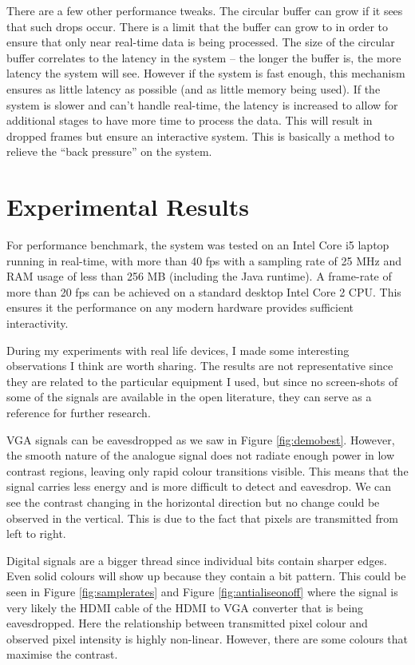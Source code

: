 \documentclass[a4paper,12pt,twoside,openright]{report}
\begin{document}
There are a few other performance tweaks. The circular buffer can grow if it sees that such drops occur. There is a limit that the buffer can grow to in order to ensure that only near real-time data is being processed. The size of the circular buffer correlates to the latency in the system -- the longer the buffer is, the more latency the system will see. However if the system is fast enough, this mechanism ensures as little latency as possible (and as little memory being used). If the system is slower and can't handle real-time, the latency is increased to allow for additional stages to have more time to process the data. This will result in dropped frames but ensure an interactive system. This is basically a method to relieve the ``back pressure'' on the system. 

\section{Experimental Results}

For performance benchmark, the system was tested on an Intel Core i5 laptop running in real-time, with more than 40 fps with a sampling rate of 25 MHz and RAM usage of less than 256 MB (including the Java runtime). A frame-rate of more than 20 fps can be achieved on a standard desktop Intel Core 2 CPU. This ensures it the performance on any modern hardware provides sufficient interactivity.

During my experiments with real life devices, I made some interesting observations I think are worth sharing. The results are not representative since they are related to the particular equipment I used, but since no screen-shots of some of the signals are available in the open literature, they can serve as a reference for further research.

VGA signals can be eavesdropped as we saw in Figure \ref{fig:demobest}. However, the smooth nature of the analogue signal does not radiate enough power in low contrast regions, leaving only rapid colour transitions visible. This means that the signal carries less energy and is more difficult to detect and eavesdrop. We can see the contrast changing in the horizontal direction but no change could be observed in the vertical. This is due to the fact that pixels are transmitted from left to right.

Digital signals are a bigger thread since individual bits contain sharper edges. Even solid colours will show up because they contain a bit pattern. This could be seen in Figure \ref{fig:samplerates} and Figure \ref{fig:antialiseonoff}  where the signal is very likely the HDMI cable of the HDMI to VGA converter that is being eavesdropped. Here the relationship between transmitted pixel colour and observed pixel intensity is highly non-linear. However, there are some colours that maximise the contrast.
\end{document}
